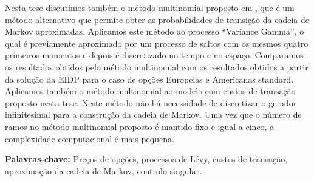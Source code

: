 Nesta tese discutimos também o método multinomial proposto em \cite{YaPr01}, que é um método alternativo que permite obter as probabilidades de transição da cadeia de Markov aproximadas. 
Aplicamos este método ao processo “Variance Gamma”, o qual é previamente aproximado por um processo de saltos com os mesmos quatro primeiros momentos e depois é discretizado 
no tempo e no espaço. 
Comparamos os resultados obtidos pelo método multinomial com os resultados obtidos a partir da solução da EIDP para o caso de opções Europeias e Americanas standard. 
Aplicamos também o método multinomial ao modelo com custos de transação proposto nesta tese. 
Neste método não há necessidade de discretizar o gerador infinitesimal para a construção da cadeia de Markov. 
Uma vez que o número de ramos no método multinomial proposto é mantido fixo e igual a cinco, a complexidade computacional é mais pequena. 

 \vspace{1em}
 \noindent \textbf{Palavras-chave:} Preços de opções, processos de Lévy, custos de transação, aproximação da cadeia de Markov, controlo singular.